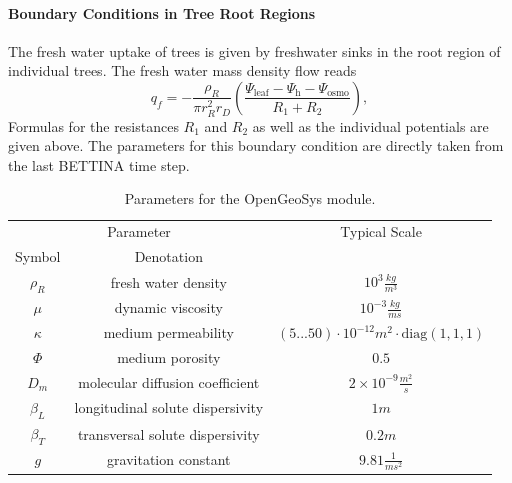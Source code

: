 \documentclass[manusscript, 12p, authoryear]{elsarticle}
\begin{document}
\paragraph{\textbf{Boundary Conditions in Tree Root Regions}}
The fresh water uptake of trees is given by freshwater sinks in the root region of individual trees.
The fresh water mass density flow reads
\begin{equation}
q_f = - \frac{\rho_R}{\pi r_R^2 r_D}\left(\frac{\Psi_{\text{leaf}} - \Psi_{\text{h}}-\Psi_{\text{osmo}}}{R_1+R_2}\right),
\end{equation}
Formulas for the resistances $R_1$ and $R_2$ as well as the individual potentials are given above.
The parameters for this boundary condition are directly taken from the last BETTINA time step.
\begin{table}[h] \label{tab_ogs_parameter}\centering
\begin{tabular}{|c|c|c|}
\hline 
\multicolumn{2}{|c|}{Parameter} & Typical Scale  \\ 
Symbol & Denotation & \\ 
\hline 
$\rho_R$ & fresh water density & $10^3 \frac{kg}{m^3}$ \\ 
\hline 
$\mu$ & dynamic viscosity & $10^{-3} \frac{kg}{ms}$ \\ 
\hline 
$\kappa$ & medium permeability & $(5...50)\cdot 10^{-12} m^2 \cdot{\text{diag}\left(1,1,1\right)}$ \\ 
\hline 
$\Phi$ & medium porosity & $0.5$ \\ 
\hline 
$D_m$ & molecular diffusion coefficient & $2\times 10^{-9} \frac{m^2}{s}$ \\ 
\hline 
$\beta_L$ & longitudinal solute dispersivity & $1m$ \\ 
\hline 
$\beta_T$ & transversal solute dispersivity & $0.2m$ \\  
\hline 
$g$ & gravitation constant & $9.81 \frac{1}{ms^2}$ \\  
\hline 
\end{tabular} 
\caption{Parameters for the OpenGeoSys module.}
\end{table}


\end{document}
